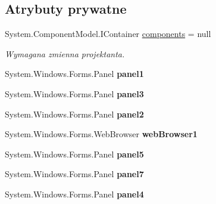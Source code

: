 \subsection*{Atrybuty prywatne}
\begin{DoxyCompactItemize}
\item 
System.\+Component\+Model.\+I\+Container \mbox{\hyperlink{class_proj__przegladarka_1_1_form1_a128c716069ac292cffd0450adb33f207}{components}} = null
\begin{DoxyCompactList}\small\item\em Wymagana zmienna projektanta. \end{DoxyCompactList}\item 
\mbox{\label{class_proj__przegladarka_1_1_form1_ae5ba366ea58301ba37c96c9502e97700}} 
System.\+Windows.\+Forms.\+Panel {\bfseries panel1}
\item 
\mbox{\label{class_proj__przegladarka_1_1_form1_a7fb9a12ff6d61f3c177bf8e50a5be82c}} 
System.\+Windows.\+Forms.\+Panel {\bfseries panel3}
\item 
\mbox{\label{class_proj__przegladarka_1_1_form1_af90bcebac8f9834df6864f985adbeeda}} 
System.\+Windows.\+Forms.\+Panel {\bfseries panel2}
\item 
\mbox{\label{class_proj__przegladarka_1_1_form1_a9085a0fd970eeeddd9de80a68d5e0cd8}} 
System.\+Windows.\+Forms.\+Web\+Browser {\bfseries web\+Browser1}
\item 
\mbox{\label{class_proj__przegladarka_1_1_form1_a7a401bb85f80464ed59ae979c3d7c49e}} 
System.\+Windows.\+Forms.\+Panel {\bfseries panel5}
\item 
\mbox{\label{class_proj__przegladarka_1_1_form1_a85e88b1f1179c1cc960fb246dd54111c}} 
System.\+Windows.\+Forms.\+Panel {\bfseries panel7}
\item 
\mbox{\label{class_proj__przegladarka_1_1_form1_a065b5d0ab3e5d62a88ee6d7376852304}} 
System.\+Windows.\+Forms.\+Panel {\bfseries panel4}
\item 
\mbox{\label{class_proj__przegladarka_1_1_form1_a9c6d562ad0c36331f171dd694a7d7eb2}} 

\end{DoxyCompactItemize}
